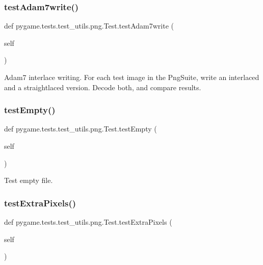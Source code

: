 \subsubsection{\texorpdfstring{test\+Adam7write()}{testAdam7write()}}
{\footnotesize\ttfamily def pygame.\+tests.\+test\+\_\+utils.\+png.\+Test.\+test\+Adam7write (\begin{DoxyParamCaption}\item[{}]{self }\end{DoxyParamCaption})}

\begin{DoxyVerb}Adam7 interlace writing.
For each test image in the PngSuite, write an interlaced
and a straightlaced version.  Decode both, and compare results.
\end{DoxyVerb}
 \mbox{\label{classpygame_1_1tests_1_1test__utils_1_1png_1_1_test_aa318df36c5822545fe0e65ac40749091}} 
\subsubsection{\texorpdfstring{test\+Empty()}{testEmpty()}}
{\footnotesize\ttfamily def pygame.\+tests.\+test\+\_\+utils.\+png.\+Test.\+test\+Empty (\begin{DoxyParamCaption}\item[{}]{self }\end{DoxyParamCaption})}

\begin{DoxyVerb}Test empty file.\end{DoxyVerb}
 \mbox{\label{classpygame_1_1tests_1_1test__utils_1_1png_1_1_test_abed379d85aeb77ff6108681c2186c2df}} 
\subsubsection{\texorpdfstring{test\+Extra\+Pixels()}{testExtraPixels()}}
{\footnotesize\ttfamily def pygame.\+tests.\+test\+\_\+utils.\+png.\+Test.\+test\+Extra\+Pixels (\begin{DoxyParamCaption}\item[{}]{self }\end{DoxyParamCaption})}

